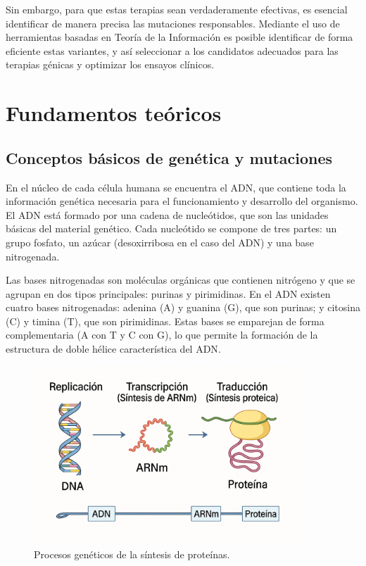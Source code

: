 \documentclass[11pt,spanish,listoffigures,listoftables]{tfgetsinf}
\begin{document}
Sin embargo, para que estas terapias sean verdaderamente efectivas, es esencial identificar de manera precisa las mutaciones responsables. Mediante el uso de herramientas basadas en Teoría de la Información es posible identificar de forma eficiente estas variantes, y así seleccionar a los candidatos adecuados para las terapias génicas y optimizar los ensayos clínicos.



\chapter{Fundamentos teóricos}

\section{Conceptos básicos de genética y mutaciones}

En el núcleo de cada célula humana se encuentra el ADN, que contiene toda la información genética necesaria para el funcionamiento y desarrollo del organismo. El ADN está formado por una cadena de nucleótidos, que son las unidades básicas del material genético. Cada nucleótido se compone de tres partes: un grupo fosfato, un azúcar (desoxirribosa en el caso del ADN) y una base nitrogenada.

Las bases nitrogenadas son moléculas orgánicas que contienen nitrógeno y que se agrupan en dos tipos principales: purinas y pirimidinas. En el ADN existen cuatro bases nitrogenadas: adenina (A) y guanina (G), que son purinas; y citosina (C) y timina (T), que son pirimidinas. Estas bases se emparejan de forma complementaria (A con T y C con G), lo que permite la formación de la estructura de doble hélice característica del ADN\cite{GEN}.


\begin{figure}[H]
   \centering
   \includegraphics[width=0.9\textwidth]{ADN.png}
   \caption{Procesos genéticos de la síntesis de proteínas.}
   \label{fig:etiqueta_opcional1}
\end{figure}
\end{document}
